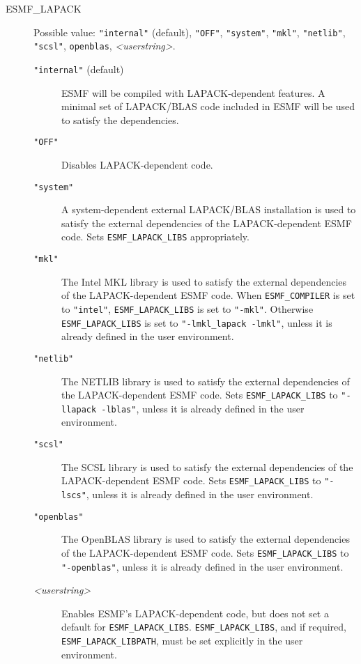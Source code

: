 \begin{description}

\item[ESMF\_LAPACK] Possible value: {\tt "internal"} (default), {\tt "OFF"},
 {\tt "system"}, {\tt "mkl"}, {\tt "netlib"}, {\tt "scsl"}, {\tt openblas}, {\it <userstring>}.

\begin{description}
\item[{\tt "internal"} (default)] ESMF will be compiled with LAPACK-dependent
features. A minimal set of LAPACK/BLAS code included in ESMF will be used
to satisfy the dependencies.

\item[{\tt "OFF"}] Disables LAPACK-dependent code.

\item[{\tt "system"}] A system-dependent external LAPACK/BLAS installation
is used to satisfy the external dependencies of the LAPACK-dependent ESMF code.
Sets {\tt ESMF\_LAPACK\_LIBS} appropriately.

\item[{\tt "mkl"}] The Intel MKL library is used to satisfy the external
dependencies of the LAPACK-dependent ESMF code. When {\tt ESMF\_COMPILER} is set to
{\tt "intel"}, {\tt ESMF\_LAPACK\_LIBS} is set to {\tt "-mkl"}.  Otherwise {\tt ESMF\_LAPACK\_LIBS}
is set to {\tt "-lmkl\_lapack -lmkl"}, unless it is already defined in the user
environment.

\item[{\tt "netlib"}] The NETLIB library is used to satisfy the external
dependencies of the LAPACK-dependent ESMF code. Sets {\tt ESMF\_LAPACK\_LIBS} to
{\tt "-llapack -lblas"}, unless it is already defined in the user environment.

\item[{\tt "scsl"}] The SCSL library is used to satisfy the external
dependencies of the LAPACK-dependent ESMF code. Sets {\tt ESMF\_LAPACK\_LIBS} to
{\tt "-lscs"}, unless it is already defined in the user environment.

\item[{\tt "openblas"}] The OpenBLAS library is used to satisfy the external
dependencies of the LAPACK-dependent ESMF code. Sets {\tt ESMF\_LAPACK\_LIBS} to
{\tt "-openblas"}, unless it is already defined in the user environment.

\item[{\it <userstring>}] Enables ESMF's LAPACK-dependent code, but does not set
a default for {\tt ESMF\_LAPACK\_LIBS}.  {\tt ESMF\_LAPACK\_LIBS}, and if
required, {\tt ESMF\_LAPACK\_LIBPATH}, must be set explicitly in the user
environment.
\end{description}


\end{description}
